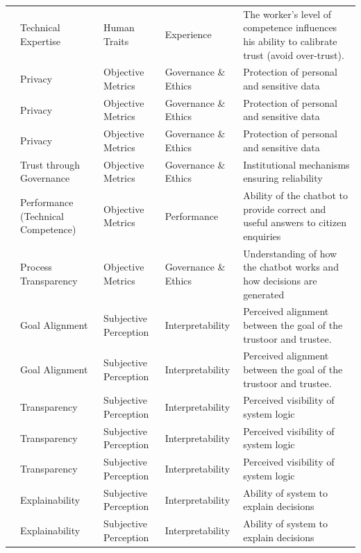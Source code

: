 \begin{longtable}{l l l l p{4cm}}
\cite{Aldoseri_et_al_2023} & Technical Expertise & Human Traits & Experience & The worker's level of competence influences his ability to calibrate trust (avoid over-trust). \\
\cite{aoki_chatbot_experimental} & Privacy & Objective Metrics & Governance \& Ethics & Protection of personal and sensitive data \\
\cite{nazar_hci_xai_healthcare} & Privacy & Objective Metrics & Governance \& Ethics & Protection of personal and sensitive data \\
\cite{afroogh_trust_in_ai} & Privacy & Objective Metrics & Governance \& Ethics & Protection of personal and sensitive data \\
\cite{afroogh_trust_in_ai} & Trust through Governance & Objective Metrics & Governance \& Ethics & Institutional mechanisms ensuring reliability \\
\cite{aoki_chatbot_experimental} & Performance (Technical Competence) & Objective Metrics & Performance & Ability of the chatbot to provide correct and useful answers to citizen enquiries \\
\cite{aoki_chatbot_experimental} & Process Transparency & Objective Metrics & Governance \& Ethics & Understanding of how the chatbot works and how decisions are generated \\
\cite{afroogh_trust_in_ai} & Goal Alignment & Subjective Perception & Interpretability & Perceived alignment between the goal of the trustoor and trustee. \\
\cite{jacovi_2021_formalizing_trust_ai} & Goal Alignment & Subjective Perception & Interpretability & Perceived alignment between the goal of the trustoor and trustee. \\
\cite{afroogh_trust_in_ai} & Transparency & Subjective Perception & Interpretability & Perceived visibility of system logic \\
\cite{glickson_2020_review_of_empirical_research} & Transparency & Subjective Perception & Interpretability & Perceived visibility of system logic \\
\cite{Bingjie_2021} & Transparency & Subjective Perception & Interpretability & Perceived visibility of system logic \\
\cite{Trust_calibratiotrust_calibration_within_a_human-robot_team} & Explainability & Subjective Perception & Interpretability & Ability of system to explain decisions \\
\cite{vilone_longo_2021} & Explainability & Subjective Perception & Interpretability & Ability of system to explain decisions \\

\end{longtable}
